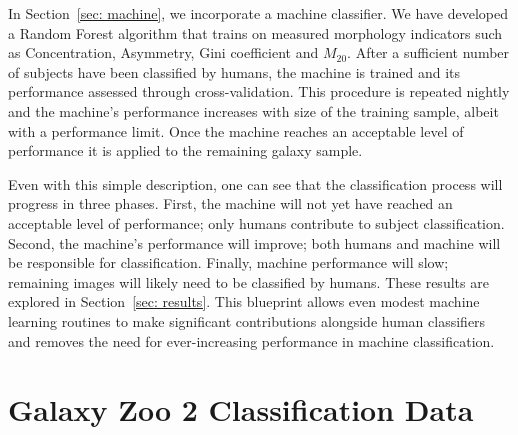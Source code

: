 \documentclass[twocolumn]{aastex6}%
\newcommand{\M}[1]{$M_{\mathrm{#1}}$}
\begin{document}
In Section~\ref{sec: machine}, we incorporate a machine classifier. We have 
developed a Random Forest algorithm that trains on measured morphology 
indicators such as Concentration, Asymmetry, Gini coefficient and 
\M{20}. After a sufficient number of subjects have been classified 
by humans,  the machine is trained and its performance assessed through 
cross-validation. This procedure is repeated nightly and the machine's performance 
increases with size of the training sample, albeit with a performance limit. 
Once the machine reaches an acceptable level of performance it is applied to the 
remaining galaxy sample. 


Even with this simple description, one can see that the classification process 
will progress in three phases.  First, the machine will not yet have reached an 
acceptable level of performance; only humans contribute to subject classification. 
Second, the machine's performance will improve; both humans and machine will 
be responsible for classification. Finally, machine performance will slow; 
remaining images will likely need to be classified by humans. These results are 
explored in  Section~\ref{sec: results}. This blueprint allows even modest 
machine learning routines to make significant contributions alongside human 
classifiers and removes the need for ever-increasing performance in machine classification.



\section{Galaxy Zoo 2 Classification Data} \label{sec: data}
\end{document}
